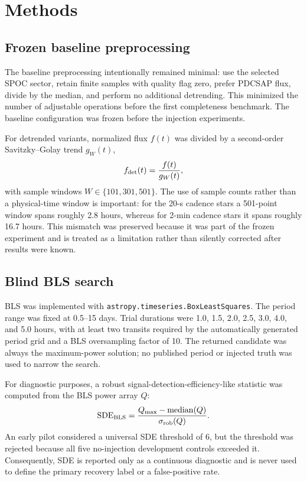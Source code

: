 \documentclass[11pt]{article}
\begin{document}
\section{Methods}
\subsection{Frozen baseline preprocessing}
The baseline preprocessing intentionally remained minimal: use the selected SPOC sector, retain finite samples with quality flag zero, prefer PDCSAP flux, divide by the median, and perform no additional detrending. This minimized the number of adjustable operations before the first completeness benchmark. The baseline configuration was frozen before the injection experiments.

For detrended variants, normalized flux $f(t)$ was divided by a second-order Savitzky--Golay trend $g_W(t)$,
\begin{equation}
f_{\rm det}(t)=\frac{f(t)}{g_W(t)},
\end{equation}
with sample windows $W\in\{101,301,501\}$. The use of sample counts rather than a physical-time window is important: for the 20-s cadence stars a 501-point window spans roughly 2.8 hours, whereas for 2-min cadence stars it spans roughly 16.7 hours. This mismatch was preserved because it was part of the frozen experiment and is treated as a limitation rather than silently corrected after results were known.

\subsection{Blind BLS search}
BLS was implemented with \texttt{astropy.timeseries.BoxLeastSquares}. The period range was fixed at 0.5--15 days. Trial durations were 1.0, 1.5, 2.0, 2.5, 3.0, 4.0, and 5.0 hours, with at least two transits required by the automatically generated period grid and a BLS oversampling factor of 10. The returned candidate was always the maximum-power solution; no published period or injected truth was used to narrow the search.

For diagnostic purposes, a robust signal-detection-efficiency-like statistic was computed from the BLS power array $Q$:
\begin{equation}
\mathrm{SDE}_{\rm BLS}=\frac{Q_{\max}-\mathrm{median}(Q)}{\sigma_{\rm rob}(Q)}.
\end{equation}
An early pilot considered a universal SDE threshold of 6, but the threshold was rejected because all five no-injection development controls exceeded it. Consequently, SDE is reported only as a continuous diagnostic and is never used to define the primary recovery label or a false-positive rate.
\end{document}
